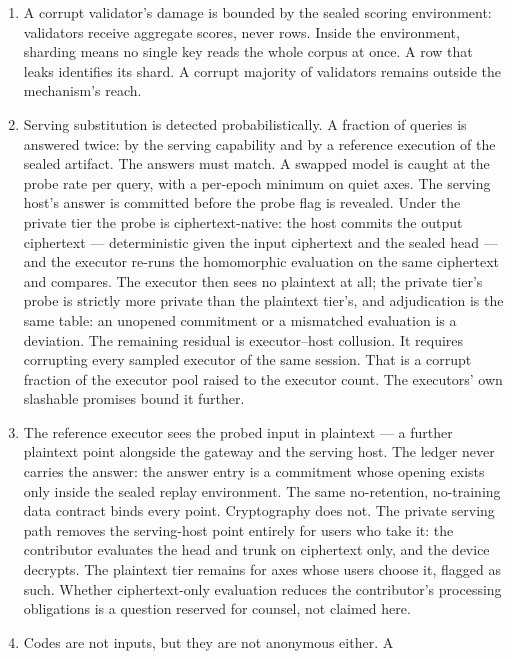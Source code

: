 \documentclass[11pt]{article}
\begin{document}
\begin{enumerate}
submission, rotation --- push the signal below the cost of
probing, not to zero. The challenge layer trades the
corpus-custody problem for label publication. Disposable
challenge data and per-submission budgets bound that trade.
\item A corrupt validator's damage is bounded by the sealed
scoring environment: validators receive aggregate scores, never
rows. Inside the environment, sharding means no single key reads
the whole corpus at once. A row that leaks identifies its shard.
A corrupt majority of validators remains outside the
mechanism's reach.
\item Serving substitution is detected probabilistically. A
fraction of queries is answered twice: by the serving capability
and by a reference execution of the sealed artifact. The answers
must match. A swapped model is caught at the probe rate per
query, with a per-epoch minimum on quiet axes. The serving host's
answer is committed before the probe flag is revealed. Under the
private tier the probe is ciphertext-native: the host commits the
output ciphertext --- deterministic given the input ciphertext and
the sealed head --- and the executor re-runs the homomorphic
evaluation on the same ciphertext and compares. The executor then
sees no plaintext at all; the private tier's probe is strictly
more private than the plaintext tier's, and adjudication is the
same table: an unopened commitment or a mismatched evaluation is
a deviation. The
remaining residual is executor--host collusion. It requires corrupting every sampled
executor of the same session. That is a corrupt fraction of the
executor pool raised to the executor count. The executors' own
slashable promises bound it further.
\item The reference executor sees the probed input in plaintext
--- a further plaintext point alongside the gateway and the
serving host. The ledger never carries the answer: the answer
entry is a commitment whose opening exists only inside the
sealed replay environment. The same
no-retention, no-training data contract binds every point.
Cryptography does not. The private serving path removes the
serving-host point entirely for users who
take it: the contributor evaluates the head and trunk on
ciphertext only, and the device decrypts. The
plaintext tier remains for axes whose users choose it, flagged as
such. Whether ciphertext-only evaluation reduces the
contributor's processing obligations is a question reserved for
counsel, not claimed here.
\item Codes are not inputs, but they are not anonymous either. A

\end{enumerate}
\end{document}

